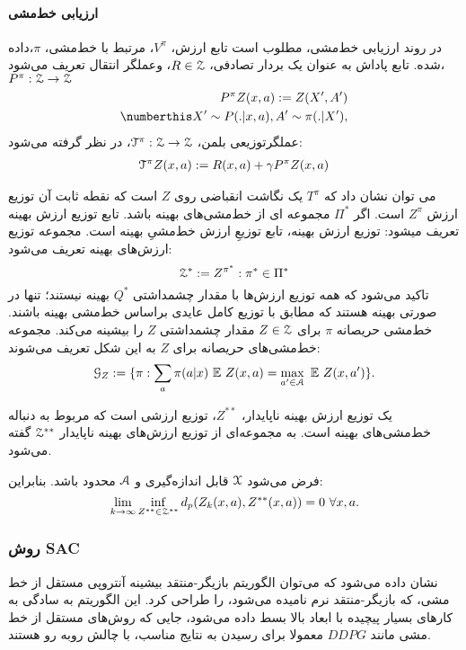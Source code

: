 \paragraph{ارزیابی خط‌مشی}
در روند ارزیابی خط‌مشی، مطلوب است تابع ارزش،
$V^\pi$،
مرتبط با خط‌مشی، $\pi$،داده شده. 
تابع پاداش به عنوان یک بردار تصادفی، 
$R \in \EuScript{Z}$،
وعملگر انتقال تعریف می‌شود،
$P^\pi : \EuScript{Z} \rightarrow \EuScript{Z}$
\begin{align}
P^{\pi} Z(x,a) := Z(X',A') \\ \numberthis
X' \sim P(.|x,a), A'\sim \pi (.|X'), \nonumber
\end{align}
عملگرتوزیعی بلمن،
$\EuScript{T}^\pi : \EuScript{Z} \rightarrow \EuScript{Z}$،
 در نظر گرفته می‌شود:
\begin{align}
 \EuScript{T}^\pi Z(x,a) := R(x,a)+ \gamma P^\pi Z(x,a)
\end{align}  

می توان نشان داد که $T^\pi$ یک نگاشت انقباضی 
روی
 $Z$
  است که نقطه ثابت آن توزیع ارزش
$Z^\pi$
    است.
اگر 
$\Pi^*$
مجموعه ای از خط‌مشی‌های بهینه باشد. 
تابع توزیع ارزش بهینه تعریف میشود:
توزیع ارزش بهینه، تابع توزیعِ ارزش خط‌مشیِ بهینه است. مجموعه توزیع ارزش‌های بهینه تعریف می‌شود:
$$\EuScript{Z}^* := {Z^{\pi^{*}} : \pi^* \in \Pi^* }$$
تاکید می‌شود که همه توزیع ارزش‌ها با مقدار چشمداشتی $Q^*$ 
بهینه نیستند؛ تنها در صورتی بهینه هستند که مطابق با توزیع کامل عایدی بر‌اساس خط‌مشی بهینه باشند.
خط‌مشی حریصانه
$\pi$
برای
$Z \in \EuScript{Z}$
مقدار چشمداشتی
$Z$
 را بیشینه می‌کند.
 مجموعه خط‌مشی‌های حریصانه برای 
 $Z$
 به این شکل تعریف می‌شوند:
 $$\EuScript{G}_Z := \lbrace \pi : \sum_{a} \pi (a|x) \ \mathbb{E} \ Z(x,a) = \max_{a' \in \EuScript{A}} \ \mathbb{E} \ Z(x,a') \rbrace.$$

یک توزیع ارزش بهینه ناپایدار،
$Z^{**}$،
توزیع ارزشی‌ است که مربوط به دنباله خط‌مشی‌های بهینه است. به مجموعه‌ای از توزیع ارزش‌های بهینه ناپایدار 
 $\EuScript{Z}^{**}$
 گفته می‌شود.

فرض می‌شود 
$\EuScript{X}$
قابل اندازه‌گیری و 
$\EuScript{A}$
محدود باشد.
بنابراین:
$$\lim_{k\to\infty} \inf_{Z^{**} \in \EuScript{Z}^{**}} d_p (Z_k (x,a), Z^{**}(x,a)) = 0  \ \forall x,a.$$

\subsubsection{ روش SAC}
نشان داده می‌شود که می‌توان الگوریتم بازیگر-منتقد بیشینه آنتروپی مستقل از خط مشی، که بازیگر-منتقد نرم
  نامیده‌ می‌شود، را طراحی کرد.
این الگوریتم به سادگی به کارهای بسیار پیچیده با ابعاد بالا بسط داده می‌شود، جایی که روش‌های مستقل از خط مشی‌ مانند
 $DDPG$
  معمولا برای رسیدن به نتایج مناسب، با چالش روبه رو هستند.
  
